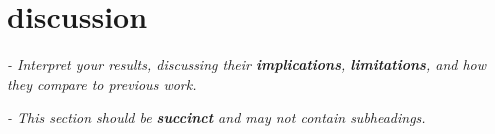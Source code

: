 \section{discussion}

\textit{- Interpret your results, discussing their \textbf{implications}, \textbf{limitations}, and how they compare to previous work.}

\textit{- This section should be \textbf{succinct} and may not contain subheadings.}
